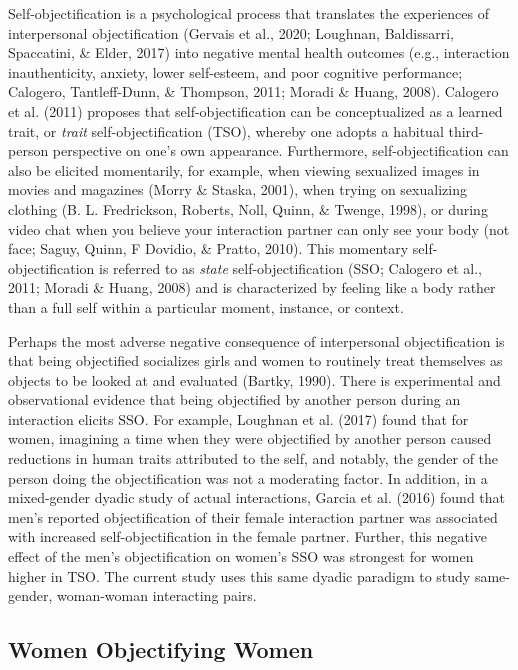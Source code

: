 \documentclass[man]{apa6}
\begin{document}
Self-objectification is a psychological process that translates the
experiences of interpersonal objectification (Gervais et al., 2020;
Loughnan, Baldissarri, Spaccatini, \& Elder, 2017) into negative mental
health outcomes (e.g., interaction inauthenticity, anxiety, lower
self-esteem, and poor cognitive performance; Calogero, Tantleff-Dunn, \&
Thompson, 2011; Moradi \& Huang, 2008). Calogero et al. (2011) proposes
that self-objectification can be conceptualized as a learned trait, or
\emph{trait} self-objectification (TSO), whereby one adopts a habitual
third-person perspective on one's own appearance. Furthermore,
self-objectification can also be elicited momentarily, for example, when
viewing sexualized images in movies and magazines (Morry \& Staska,
2001), when trying on sexualizing clothing (B. L. Fredrickson, Roberts,
Noll, Quinn, \& Twenge, 1998), or during video chat when you believe
your interaction partner can only see your body (not face; Saguy, Quinn,
F Dovidio, \& Pratto, 2010). This momentary self-objectification is
referred to as \emph{state} self-objectification (SSO; Calogero et al.,
2011; Moradi \& Huang, 2008) and is characterized by feeling like a body
rather than a full self within a particular moment, instance, or
context.

Perhaps the most adverse negative consequence of interpersonal
objectification is that being objectified socializes girls and women to
routinely treat themselves as objects to be looked at and evaluated
(Bartky, 1990). There is experimental and observational evidence that
being objectified by another person during an interaction elicits SSO.
For example, Loughnan et al. (2017) found that for women, imagining a
time when they were objectified by another person caused reductions in
human traits attributed to the self, and notably, the gender of the
person doing the objectification was not a moderating factor. In
addition, in a mixed-gender dyadic study of actual interactions, Garcia
et al. (2016) found that men's reported objectification of their female
interaction partner was associated with increased self-objectification
in the female partner. Further, this negative effect of the men's
objectification on women's SSO was strongest for women higher in TSO.
The current study uses this same dyadic paradigm to study same-gender,
woman-woman interacting pairs.

\subsection{Women Objectifying Women}\label{women-objectifying-women}
\end{document}
